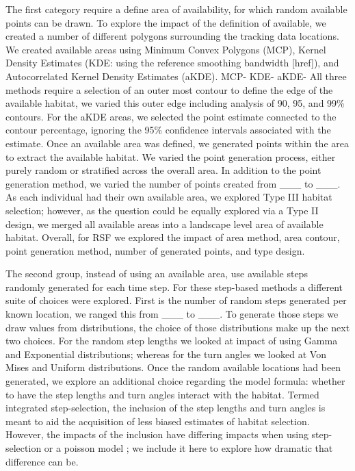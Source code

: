 \documentclass[10pt,a4paper]{article}
\begin{document}
The first category require a define area of availability, for which random available points can be drawn.
To explore the impact of the definition of available, we created a number of different polygons surrounding the tracking data locations.
We created available areas using Minimum Convex Polygons (MCP), Kernel Density Estimates (KDE: using the reference smoothing bandwidth {[}href{]}), and Autocorrelated Kernel Density Estimates (aKDE).
MCP-
KDE-
aKDE-
All three methods require a selection of an outer most contour to define the edge of the available habitat, we varied this outer edge including analysis of 90, 95, and 99\% contours.
For the aKDE areas, we selected the point estimate connected to the contour percentage, ignoring the 95\% confidence intervals associated with the estimate.
Once an available area was defined, we generated points within the area to extract the available habitat.
We varied the point generation process, either purely random or stratified across the overall area.
In addition to the point generation method, we varied the number of points created from \_\_\_ to \_\_\_.
As each individual had their own available area, we explored Type III habitat selection; however, as the question could be equally explored via a Type II design, we merged all available areas into a landscape level area of available habitat.
Overall, for RSF we explored the impact of area method, area contour, point generation method, number of generated points, and type design.

The second group, instead of using an available area, use available steps randomly generated for each time step.
For these step-based methods a different suite of choices were explored.
First is the number of random steps generated per known location, we ranged this from \_\_\_ to \_\_\_.
To generate those steps we draw values from distributions, the choice of those distributions make up the next two choices.
For the random step lengths we looked at impact of using Gamma and Exponential distributions; whereas for the turn angles we looked at Von Mises and Uniform distributions.
Once the random available locations had been generated, we explore an additional choice regarding the model formula: whether to have the step lengths and turn angles interact with the habitat.
Termed integrated step-selection, the inclusion of the step lengths and turn angles is meant to aid the acquisition of less biased estimates of habitat selection.
However, the impacts of the inclusion have differing impacts when using step-selection or a poisson model ; we include it here to explore how dramatic that difference can be.
\end{document}
